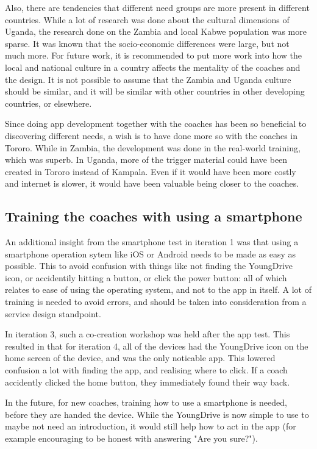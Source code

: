 Also, there are tendencies that different need groups are more present in different countries. While a lot of research was done about the cultural dimensions of Uganda, the research done on the Zambia and local Kabwe population was more sparse. It was known that the socio-economic differences were large, but not much more. For future work, it is recommended to put more work into how the local and national culture in a country affects the mentality of the coaches and the design. It is not possible to assume that the Zambia and Uganda culture should be similar, and it will be similar with other countries in other developing countries, or elsewhere.

Since doing app development together with the coaches has been so beneficial to discovering different needs, a wish is to have done more so with the coaches in Tororo. While in Zambia, the development was done in the real-world training, which was superb. In Uganda, more of the trigger material could have been created in Tororo instead of Kampala. Even if it would have been more costly and internet is slower, it would have been valuable being closer to the coaches.

\subsection{Training the coaches with using a smartphone}
An additional insight from the smartphone test in iteration 1 was that using a smartphone operation sytem like iOS or Android needs to be made as easy as possible. This to avoid confusion with things like not finding the YoungDrive icon, or accidentily hitting a button, or click the power button: all of which relates to ease of using the operating system, and not to the app in itself. A lot of training is needed to avoid errors,  and should be taken into consideration from a service design standpoint.

In iteration 3, such a co-creation workshop was held after the app test. This resulted in that for iteration 4, all of the devices had the YoungDrive icon on the home screen of the device, and was the only noticable app. This lowered confusion a lot with finding the app, and realising where to click. If a coach accidently clicked the home button, they immediately found their way back.

In the future, for new coaches, training how to use a smartphone is needed, before they are handed the device. While the YoungDrive is now simple to use to maybe not need an introduction, it would still help how to act in the app (for example encouraging to be honest with answering "Are you sure?").
